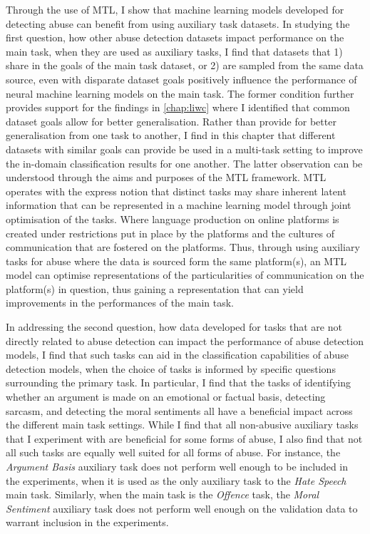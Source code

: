 Through the use of MTL, I show that machine learning models developed for detecting abuse can benefit from using auxiliary task datasets.
In studying the first question, how other abuse detection datasets impact performance on the main task, when they are used as auxiliary tasks, I find that datasets that 1) share in the goals of the main task dataset, or 2) are sampled from the same data source, even with disparate dataset goals positively influence the performance of neural machine learning models on the main task.
The former condition further provides support for the findings in \cref{chap:liwc} where I identified that common dataset goals allow for better generalisation.
Rather than provide for better generalisation from one task to another, I find in this chapter that different datasets with similar goals can provide be used in a multi-task setting to improve the in-domain classification results for one another.
The latter observation can be understood through the aims and purposes of the MTL framework.
MTL operates with the express notion that distinct tasks may share inherent latent information that can be represented in a machine learning model through joint optimisation of the tasks.
Where language production on online platforms is created under restrictions put in place by the platforms and the cultures of communication that are fostered on the platforms.
Thus, through using auxiliary tasks for abuse where the data is sourced form the same platform(s), an MTL model can optimise representations of the particularities of communication on the platform(s) in question, thus gaining a representation that can yield improvements in the performances of the main task.

In addressing the second question, how data developed for tasks that are not directly related to abuse detection can impact the performance of abuse detection models, I find that such tasks can aid in the classification capabilities of abuse detection models, when the choice of tasks is informed by specific questions surrounding the primary task.
In particular, I find that the tasks of identifying whether an argument is made on an emotional or factual basis, detecting sarcasm, and detecting the moral sentiments all have a beneficial impact across the different main task settings.
While I find that all non-abusive auxiliary tasks that I experiment with are beneficial for some forms of abuse, I also find that not all such tasks are equally well suited for all forms of abuse.
For instance, the \textit{Argument Basis} auxiliary task does not perform well enough to be included in the experiments, when it is used as the only auxiliary task to the \textit{Hate Speech} main task.
Similarly, when the main task is the \textit{Offence} task, the \textit{Moral Sentiment} auxiliary task does not perform well enough on the validation data to warrant inclusion in the experiments.

